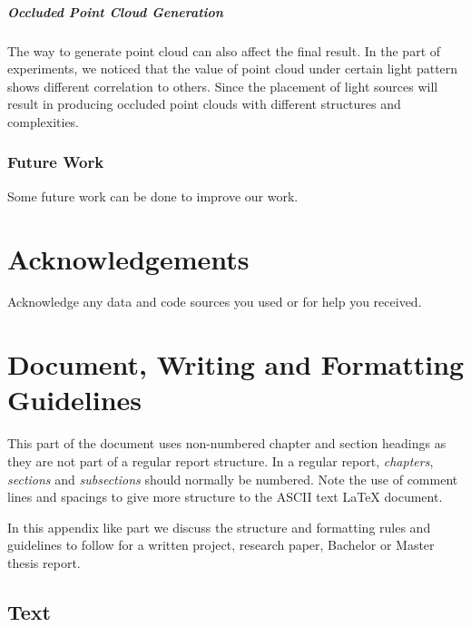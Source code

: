 \documentclass[11pt, a4paper,oneside,chapterprefix=false]{scrbook}
\begin{document}
\paragraph{Occluded Point Cloud Generation}

The way to generate point cloud can also affect the final result. In the part of experiments, we noticed that the value of point cloud under certain light pattern shows different correlation to others. Since the placement of light sources will result in producing occluded point clouds with different structures and complexities.

\subsection{Future Work}

Some future work can be done to improve our work.

\chapter{Acknowledgements} \label{chp:acknowledgements}

Acknowledge any data and code sources you used or for help you received.


\chapter*{Document, Writing and Formatting Guidelines}

This part of the document uses non-numbered chapter and section headings as they are not part of a regular report structure. In a regular report, \emph{chapters}, \emph{sections} and \emph{subsections} should normally be numbered. Note the use of comment lines and spacings to give more structure to the ASCII text LaTeX document.

In this appendix like part we discuss the structure and formatting rules and guidelines to follow for a written project, research paper, Bachelor or Master thesis report.

\section*{Text} \label{sec:text}
\end{document}
